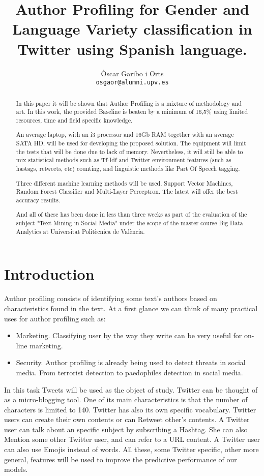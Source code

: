 \documentclass[11pt,a4paper]{article}
\title{Author Profiling for Gender and Language Variety classification in Twitter using Spanish language.}
\author{\`Oscar Garibo i Orts \\
  {\tt osgaor@alumni.upv.es} \\}
\date{}
\begin{document}
\maketitle
\begin{abstract}

  In this paper it will be shown that Author Profiling is a mixture of methodology and art. In this work, the provided Baseline is beaten by a minimum of 16,5\% using limited resources, time and field specific knowledge.
  
  An average laptop, with an i3 processor and 16Gb RAM together with an average SATA HD, will be used for developing the proposed solution. The equipment will limit the tests that will be done due to lack of memory. Nevertheless, it will still be able to mix statistical methods such as Tf-Idf and Twitter environment features (such as hastags, retweets, etc) counting, and linguistic methods like Part Of Speech tagging.
  
  Three different machine learning methods will be used, Support Vector Machines, Random Forest Classifier and Multi-Layer Perceptron. The latest will offer the best accuracy results. 
  
  And all of these has been done in less than three weeks as part of the evaluation of the subject "Text Mining in Social Media" under the scope of the master course Big Data Analytics at Universitat Polit\`ecnica de Val\`encia. 
  
  
\end{abstract}


\section{Introduction}

Author profiling consists of identifying some text's authors based on characteristics found in the text. At a first glance we can think of many practical uses for author profiling such as:
\begin{itemize}
\item Marketing. Classifying user by the way they write can be very useful for on-line marketing.
\item Security. Author profiling is already being used to detect threats in social media. From terrorist detection to paedophiles detection in social media.
\end{itemize}

In this task Tweets will be used as the object of study. Twitter can be thought of as a micro-blogging tool. One of its main characteristics is that the number of characters is limited to 140. Twitter has also its own specific vocabulary. Twitter users can create their own contents or can Retweet other's contents. A Twitter user can talk about an specific subject by subscribing a Hashtag. She can also Mention some other Twitter user, and can refer to a URL content. A Twitter user can also use Emojis instead of words. All these, some Twitter specific, other more general, features will be used to improve the predictive performance of our models.
\end{document}
